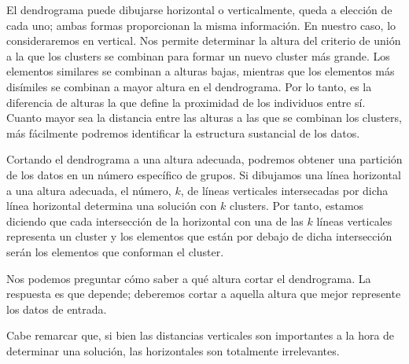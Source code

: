 El dendrograma puede dibujarse horizontal o verticalmente, queda a elección de cada uno; ambas formas proporcionan la misma información. En nuestro caso, lo consideraremos en vertical. Nos permite 
determinar la altura del criterio de unión a la que los clusters se combinan para formar un nuevo cluster más grande. Los elementos similares se combinan a alturas bajas, mientras que los elementos
más disímiles se combinan a mayor altura en el dendrograma. Por lo tanto, es la diferencia de alturas la que define la proximidad de los individuos entre sí. Cuanto mayor sea la distancia entre las
alturas a las que se combinan los clusters, más fácilmente podremos identificar la estructura sustancial de los datos. \newline

Cortando el dendrograma a una altura adecuada, podremos obtener una partición de los datos en un número específico de grupos. Si dibujamos una línea horizontal a una altura adecuada, el número, $k$, de 
líneas verticales intersecadas por dicha línea horizontal determina una solución con $k$ clusters. Por tanto, estamos diciendo que cada intersección de la horizontal con una de las $k$ líneas verticales
representa un cluster y los elementos que están por debajo de dicha intersección serán los elementos que conforman el cluster. \newline

Nos podemos preguntar cómo saber a qué altura cortar el dendrograma. La respuesta es que depende; deberemos cortar a aquella altura que mejor represente los datos de entrada.\newline %

\begin{nota}
    
    Cabe remarcar que, si bien las distancias verticales son importantes a la hora de determinar una solución, las horizontales son totalmente irrelevantes. \newline

\end{nota}

